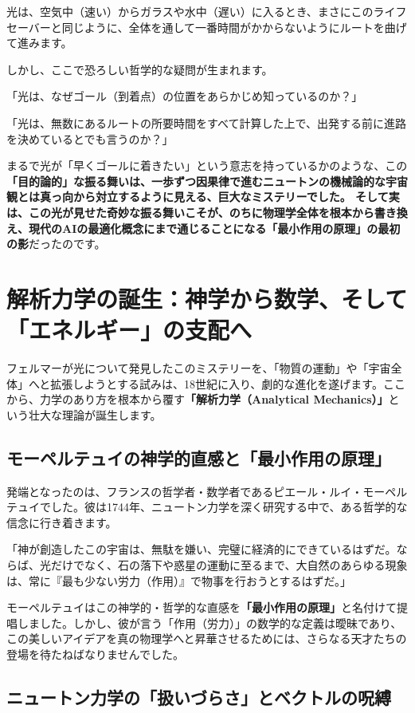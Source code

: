 光は、空気中（速い）からガラスや水中（遅い）に入るとき、まさにこのライフセーバーと同じように、全体を通して一番時間がかからないようにルートを曲げて進みます。

しかし、ここで恐ろしい哲学的な疑問が生まれます。

「光は、なぜゴール（到着点）の位置をあらかじめ知っているのか？」

「光は、無数にあるルートの所要時間をすべて計算した上で、出発する前に進路を決めているとでも言うのか？」

まるで光が「早くゴールに着きたい」という意志を持っているかのような、この\textbf{「目的論的」な振る舞いは、一歩ずつ因果律で進むニュートンの機械論的な宇宙観とは真っ向から対立するように見える、巨大なミステリーでした。 そして実は、この光が見せた奇妙な振る舞いこそが、のちに物理学全体を根本から書き換え、現代のAIの最適化概念にまで通じることになる「最小作用の原理」の最初の影}だったのです。

\section{解析力学の誕生：神学から数学、そして「エネルギー」の支配へ}

フェルマーが光について発見したこのミステリーを、「物質の運動」や「宇宙全体」へと拡張しようとする試みは、18世紀に入り、劇的な進化を遂げます。ここから、力学のあり方を根本から覆す\textbf{「解析力学（Analytical Mechanics）」}という壮大な理論が誕生します。

\subsection{モーペルテュイの神学的直感と「最小作用の原理」}

発端となったのは、フランスの哲学者・数学者であるピエール・ルイ・モーペルテュイでした。彼は1744年、ニュートン力学を深く研究する中で、ある哲学的な信念に行き着きます。

「神が創造したこの宇宙は、無駄を嫌い、完璧に経済的にできているはずだ。ならば、光だけでなく、石の落下や惑星の運動に至るまで、大自然のあらゆる現象は、常に『最も少ない労力（作用）』で物事を行おうとするはずだ。」

モーペルテュイはこの神学的・哲学的な直感を\textbf{「最小作用の原理」}と名付けて提唱しました。しかし、彼が言う「作用（労力）」の数学的な定義は曖昧であり、この美しいアイデアを真の物理学へと昇華させるためには、さらなる天才たちの登場を待たねばなりませんでした。

\subsection{ニュートン力学の「扱いづらさ」とベクトルの呪縛}

